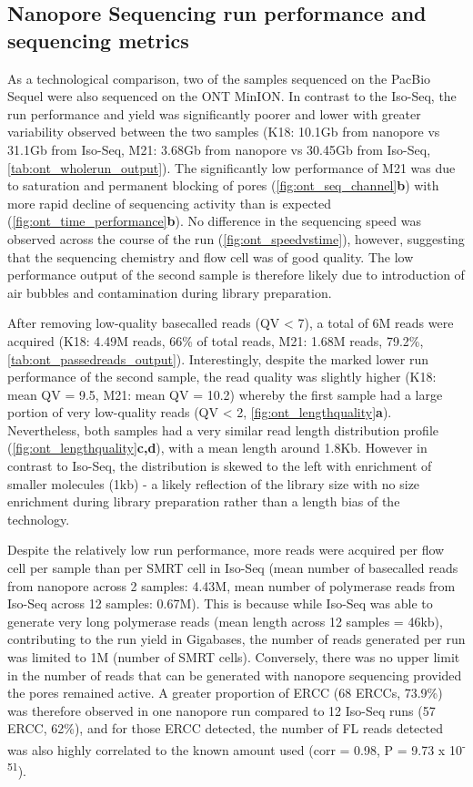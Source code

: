 \subsection{Nanopore Sequencing run performance and sequencing metrics}
As a technological comparison, two of the samples sequenced on the PacBio Sequel were also sequenced on the ONT MinION. In contrast to the Iso-Seq, the run performance and yield was significantly poorer and lower with greater variability observed between the two samples (K18: 10.1Gb from nanopore vs 31.1Gb from Iso-Seq, M21: 3.68Gb from nanopore vs 30.45Gb from Iso-Seq, \cref{tab:ont_wholerun_output}). The significantly low performance of M21 was due to saturation and permanent blocking of pores (\cref{fig:ont_seq_channel}\textbf{b}) with more rapid decline of sequencing activity than is expected (\cref{fig:ont_time_performance}\textbf{b}). No difference in the sequencing speed was observed across the course of the run (\cref{fig:ont_speedvstime}), however, suggesting that the sequencing chemistry and flow cell was of good quality. The low performance output of the second sample is therefore likely due to introduction of air bubbles and contamination during library preparation.

After removing low-quality basecalled reads (QV < 7), a total of 6M reads were acquired (K18: 4.49M reads, 66\% of total reads, M21: 1.68M reads, 79.2\%, \cref{tab:ont_passedreads_output}). Interestingly, despite the marked lower run performance of the second sample, the read quality was slightly higher (K18: mean QV = 9.5, M21: mean QV = 10.2) whereby the first sample had a large portion of very low-quality reads (QV < 2, \cref{fig:ont_lengthquality}\textbf{a}). Nevertheless, both samples had a very similar read length distribution profile (\cref{fig:ont_lengthquality}\textbf{c,d}), with a mean length around 1.8Kb. However in contrast to Iso-Seq, the distribution is skewed to the left with enrichment of smaller molecules (1kb) - a likely reflection of the library size with no size enrichment during library preparation rather than a length bias of the technology. 

Despite the relatively low run performance, more reads were acquired per flow cell per sample than per SMRT cell in Iso-Seq (mean number of basecalled reads from nanopore across 2 samples: 4.43M, mean number of polymerase reads from Iso-Seq across 12 samples: 0.67M). This is because while Iso-Seq was able to generate very long polymerase reads (mean length across 12 samples = 46kb), contributing to the run yield in Gigabases, the number of reads generated per run was limited to 1M (number of SMRT cells). Conversely, there was no upper limit in the number of reads that can be generated with nanopore sequencing provided the pores remained active. A greater proportion of ERCC (68 ERCCs, 73.9\%) was therefore observed in one nanopore run compared to 12 Iso-Seq runs (57 ERCC, 62\%), and for those ERCC detected, the number of FL reads detected was also highly correlated to the known amount used (corr = 0.98, P = 9.73 x 10\textsuperscript{-51}). 


